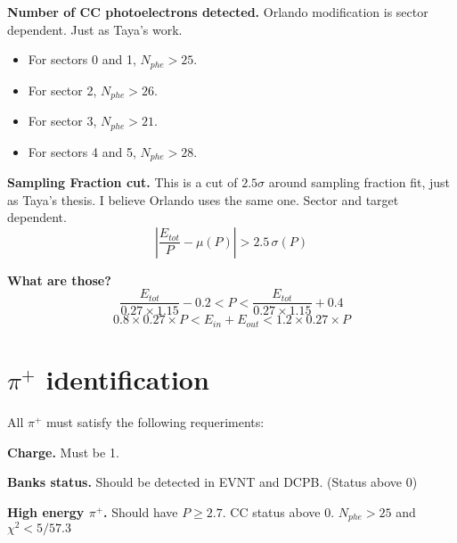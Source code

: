 \textbf{Number of CC photoelectrons detected.} Orlando modification is sector dependent. Just as Taya's work.
\begin{itemize}
    \item For sectors 0 and 1, $N_{phe} > 25$.
    \item For sector 2, $N_{phe} > 26$.
    \item For sector 3, $N_{phe} > 21$.
    \item For sectors 4 and 5, $N_{phe} > 28$.
\end{itemize}

\textbf{Sampling Fraction cut.} This is a cut of $2.5 \sigma$ around sampling fraction fit, just as Taya's thesis. I believe Orlando uses the same one. Sector and target dependent.
\begin{equation}
    \left| \frac{E_{tot}}{P} - \mu(P) \right| > 2.5 \, \sigma(P)
\end{equation}

\textbf{What are those?}
\begin{equation}
	\frac{E_{tot}}{0.27 \times 1.15} - 0.2 < P < \frac{E_{tot}}{0.27 \times 1.15} + 0.4
\end{equation}
\begin{equation}
    0.8 \times 0.27 \times P < E_{in} + E_{out} < 1.2 \times 0.27 \times P
\end{equation}
\section{$\pi^{+}$ identification}

All $\pi^{+}$ must satisfy the following requeriments:

\textbf{Charge.} Must be 1.

\textbf{Banks status.} Should be detected in EVNT and DCPB. (Status above 0)

\textbf{High energy $\pi^+$.} Should have $P \ge 2.7$. CC status above 0. $N_{phe} > 25$ and $\chi^2 < 5/57.3$
                        
